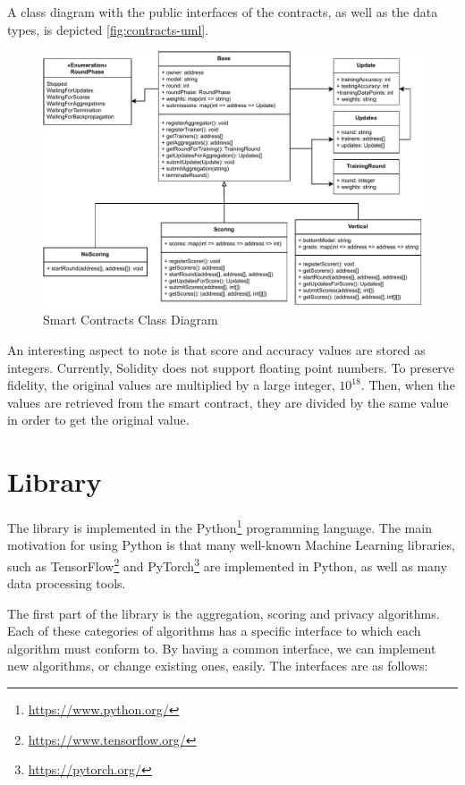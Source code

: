 A class diagram with the public interfaces of the contracts, as well as the data types, is depicted \autoref{fig:contracts-uml}.

\begin{figure}[!ht]
    \centering
    \centering
    \includegraphics[width=1\textwidth]{graphics/smart-contract-uml.pdf}
    \caption{Smart Contracts Class Diagram}
    \label{fig:contracts-uml}
\end{figure}

An interesting aspect to note is that score and accuracy values are stored as integers. Currently, Solidity does not support floating point numbers. To preserve fidelity, the original values are multiplied by a large integer, $10^{18}$. Then, when the values are retrieved from the smart contract, they are divided by the same value in order to get the original value.

\section{Library}

The library is implemented in the Python\footnote{\url{https://www.python.org/}} programming language. The main motivation for using Python is that many well-known Machine Learning libraries, such as TensorFlow\footnote{\url{https://www.tensorflow.org/}} and PyTorch\footnote{\url{https://pytorch.org/}} are implemented in Python, as well as many data processing tools.

The first part of the library is the aggregation, scoring and privacy algorithms. Each of these categories of algorithms has a specific interface to which each algorithm must conform to. By having a common interface, we can implement new algorithms, or change existing ones, easily. The interfaces are as follows:

